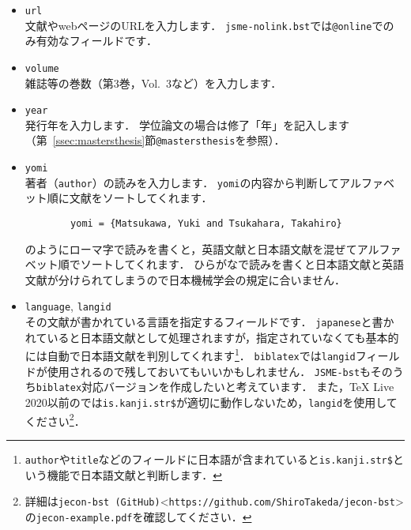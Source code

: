 \documentclass[a4paper,fleqn,uplatex,dvipdfmx]{jsarticle}
\makeatletter
\newcommand{\jsmefile}{\texttt{jsme-nolink.bst}}
\newcommand{\JSMErepos}{\texttt{JSME-bst}}
\newcommand{\ttmastersthesis}{\texttt{@mastersthesis}}
\newcommand{\ttonline}{\texttt{@online}}
\makeatother
\begin{document}
\begin{itemize}
    \item \verb|url| \\
        文献やwebページのURLを入力します．
        \jsmefile では\ttonline でのみ有効なフィールドです．
    \item \verb|volume| \\
        雑誌等の巻数（第3巻，Vol.~3など）を入力します．
    \item \verb|year| \\
        発行年を入力します．
        学位論文の場合は修了「年」を記入します（第~\ref{ssec:mastersthesis}節\ttmastersthesis を参照）．
    \item \verb|yomi| \\
        著者（\verb|author|）の読みを入力します．
        \verb|yomi|の内容から判断してアルファベット順に文献をソートしてくれます．
        \begin{verbatim}
        yomi = {Matsukawa, Yuki and Tsukahara, Takahiro}
        \end{verbatim}
        のようにローマ字で読みを書くと，英語文献と日本語文献を混ぜてアルファベット順でソートしてくれます．
        ひらがなで読みを書くと日本語文献と英語文献が分けられてしまうので日本機械学会の規定に合いません．
    \item \verb|language|, \verb|langid| \\
        その文献が書かれている言語を指定するフィールドです．
        \verb|japanese|と書かれていると日本語文献として処理されますが，指定されていなくても基本的には自動で日本語文献を判別してくれます\footnote{\texttt{author}や\texttt{title}などのフィールドに日本語が含まれていると\texttt{is.kanji.str\$}という機能で日本語文献と判断します．}．
        \verb|biblatex|では\verb|langid|フィールドが使用されるので残しておいてもいいかもしれません．
        \JSMErepos もそのうち\verb|biblatex|対応バージョンを作成したいと考えています．
        また，TeX Live 2020以前の\upBibTeX{}では\verb|is.kanji.str$|が適切に動作しないため，\verb|langid|を使用してください\footnote{詳細は\verb|jecon-bst (GitHub)|\textless \verb|https://github.com/ShiroTakeda/jecon-bst|\textgreater の\verb|jecon-example.pdf|を確認してください．}．
\end{itemize}
\end{document}
